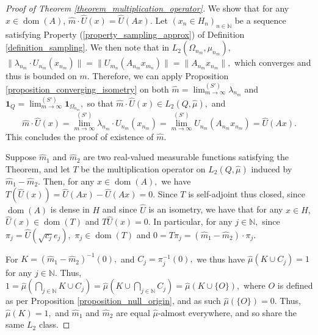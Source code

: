 \documentclass{amsart}
\theoremstyle{definition}
\theoremstyle{remark}
\def \Dom{\operatorname{dom}}
\def \HMU{\hat{\mu}}
\def \HU{\hat{U}}
\def \Hm{\hat{m}}
\begin{document}
\begin{proof}[Proof of Theorem \ref{theorem_multiplication_operator}]
	We show that for any $x\in\Dom(A)$, $\Hm\cdot\HU(x)=\HU(Ax).$ Let $(x_n\in H_n)_{n\in\mathbb{N}}$ be a sequence satisfying Property (\ref{property_sampling_approx}) of Definition \ref{definition_sampling}. We then note that in $L_2(\Omega_{n_m},\mu_{n_m}),$ $\|\lambda_{n_m}\cdot U_{n_m}(x_{n_m})\|=\|U_{m_n}(A_{n_m}x_{m_n})\|=\|A_{n_m}x_{n_m}\|,$ which converges and thus is bounded on $m$. Therefore, we can apply Proposition \ref{proposition_converging_isometry} on both $\Hm=\lim^{(S')}_{m\rightarrow\infty} \lambda_{n_m}$ and $\mathbf{1}_Q=\lim^{(S')}_{m\rightarrow\infty}\mathbf{1}_{\Omega_{n_m}},$ so that $\Hm\cdot \HU(x)\in L_2(Q,\HMU),$ and $$\Hm\cdot\HU(x)={\lim}^{(S')}_{m\rightarrow\infty} \lambda_{n_m}\cdot U_{n_m}(x_{n_m})={\lim}^{(S')}_{m\rightarrow\infty}U_{n_m}(A_{n_m}x_{n_m})=\HU(Ax). $$ This concludes the proof of existence of $\Hm$.
	
	Suppose $\Hm_1$ and $\Hm_2$ are two real-valued measurable functions satisfying the Theorem, and let $T$ be the multiplication operator on $L_2(Q,\HMU)$ induced by $\Hm_1-\Hm_2$. Then, for any $x\in\Dom(A),$  we have $T(\HU(x))=\HU(Ax)-\HU(Ax)=0$. Since $T$ is self-adjoint thus closed, since $\Dom(A)$ is dense in $H$ and since $\HU$ is an isometry, we have that for any $x\in H,$ $\HU(x)\in\Dom(T)$ and $T\HU(x)=0.$ In particular, for any $j\in\mathbb{N},$ since $\pi_j=\HU(\sqrt{c_j}e_j),$ $\pi_j\in\Dom(T)$ and $0=T\pi_j=(\Hm_1-\Hm_2)\cdot\pi_j.$  
	
	For $K=(\Hm_1-\Hm_2)^{-1}(0),$ and $C_j=\pi_j^{-1}(0),$ we thus have $\HMU(K\cup C_j)=1$ for any $j\in\mathbb{N}.$ Thus, $1=\HMU(\bigcap_{j\in\mathbb{N}} K\cup C_j)=\HMU(K\cup\bigcap_{j\in\mathbb{N}}C_j)=\HMU(K\cup\{O\}),$ where $O$ is defined as per Proposition \ref{proposition_null_origin}, and as such $\HMU(\{O\})=0$. Thus, $\HMU(K)=1,$ and $\Hm_1$ and $\Hm_2$ are equal $\HMU$-almost everywhere, and so share the same $L_2$ class.
\end{proof}
\end{document}
